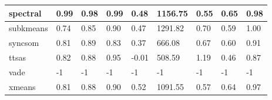 \begin{table}[H]
\begin{tabular}{|l|l|l|l|l|l|l|l|l|}
\hline
spectral & 0.99 & 0.98 & 0.99 & 0.48 & 1156.75 & 0.55 & 0.65 & 0.98 \\
\hline
subkmeans & 0.74 & 0.85 & 0.90 & 0.47 & 1291.82 & 0.70 & 0.59 & 1.00 \\
\hline
syncsom & 0.81 & 0.89 & 0.83 & 0.37 & 666.08 & 0.67 & 0.60 & 0.91 \\
\hline
ttsas & 0.82 & 0.88 & 0.95 & -0.01 & 508.59 & 1.19 & 0.46 & 0.87 \\
\hline
vade & -1 & -1 & -1 & -1 & -1 & -1 & -1 & -1 \\
\hline
xmeans & 0.81 & 0.88 & 0.90 & 0.52 & 1091.55 & 0.57 & 0.64 & 0.97 \\
\hline
\end{tabular}
\end{table}